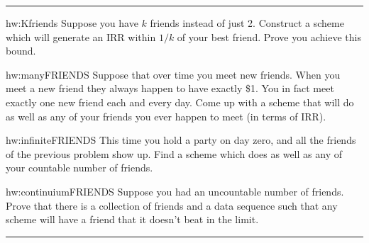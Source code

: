 \documentclass{book}
\newenvironment{textHW}{
  \noindent\rule{\textwidth}{1pt}%
  \begin{list}{}{
      \setlength{\labelwidth}{1cm}
      \setlength{\labelsep}{0.3cm}
      \setlength{\leftmargin}{1.3cm}
      \setlength{\rightmargin}{1cm}
      \setlength{\parsep}{0.5ex plus0.2ex minus0.1ex}
      \setlength{\topsep}{1pt plus3pt minus1pt}
      \setlength{\itemsep}{0ex plus0.2ex} 
      \renewcommand{\makelabel}[1]{\label{thw:##1}{\ref{##1}}}
      \sl}}%
  {\end{list}\rule{\textwidth}{1pt}}
\begin{document}
\begin{textHW}
\item[hw:Kfriends] Suppose you have $k$ friends instead of just 2.
  Construct a scheme which will generate an IRR within $1/k$ of your
  best friend.  Prove you achieve this bound.
\item[hw:manyFRIENDS] Suppose that over time you meet new friends.
  When you meet a new friend they always happen to have exactly \$1.
  You in fact meet exactly one new friend each and every day.  Come up
  with a scheme that will do as well as any of your friends you ever
  happen to meet (in terms of IRR).
\item[hw:infiniteFRIENDS]  This time you hold a party on day zero, and
  all the friends of the previous problem show up.  Find a scheme
  which does as well as any of your countable number of friends.
\item[hw:continuiumFRIENDS] Suppose you had an uncountable number of
  friends.  Prove that there is a collection of friends and a data
  sequence such that any scheme will have a friend that it doesn't
  beat in the limit.
\end{textHW}
\end{document}
